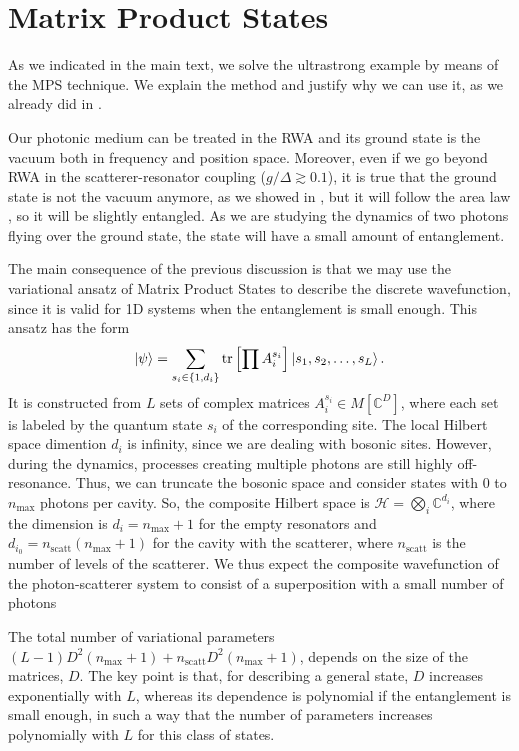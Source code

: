 \documentclass[aps,pra,reprint,amsmath,amssymb]{revtex4-1}
\begin{document}
\section{Matrix Product States}

As we indicated in the main text, we solve the ultrastrong example by means of the MPS technique. We explain the method and justify why we can use it, as we already did in \cite{Sanchez-Burillo2014,Sanchez-Burillo2015,Sanchez-Burillo2016a}.

Our photonic medium can be treated in the RWA and its ground state is the vacuum both in frequency and position space. Moreover, even if we go beyond RWA in the scatterer-resonator coupling ($g/\Delta\gtrsim 0.1$), it is true that the ground state is not the vacuum anymore, as we showed in \cite{Sanchez-Burillo2014}, but it will follow the area law \cite{Eisert2010}, so it will be slightly entangled. As we are studying the dynamics of two photons flying over the ground state, the state will have a small amount of entanglement.

The main consequence of the previous discussion is that we may use the variational ansatz of Matrix Product States \cite{Ripoll2006,Verstraete2008} to describe the discrete wavefunction, since it is valid for 1D systems when the entanglement is small enough. This ansatz has the form
\begin{equation}
\ket{\psi} = \sum_{s_i \in \{1,d_i\}} \mathrm{tr}\left[
\prod A_i^{s_i}\right] \ket{s_1,s_2,\ldots,s_L}.
\label{eq:mps}
\end{equation}
It is constructed from $L$ sets of complex matrices $A_i^{s_i} \in M[\mathbb{C}^{D}]$, where each set is labeled by the quantum state $s_i$ of the corresponding site. The local Hilbert space dimention $d_i$ is infinity, since we are dealing with bosonic sites. However, during the dynamics, processes creating multiple photons are still highly off-resonance. Thus, we can truncate the bosonic space and consider states with $0$ to
$n_\text{max}$ photons per cavity. So, the composite Hilbert space is $\mathcal{H}=\bigotimes_i \mathbb{C}^{d_i}$, where the dimension is $d_i=n_\text{max}+1$ for the empty resonators and $d_{i_0}=n_\text{scatt}(n_\text{max}+1)$ for the cavity with the scatterer, where $n_\text{scatt}$ is the number of levels of the scatterer. We thus expect the composite wavefunction of the photon-scatterer system to consist of a superposition with a small number of photons

The total number of variational parameters $(L-1)D^2(n_\text{max}+1) + n_\text{scatt}D^2(n_\text{max}+1)$, depends on the size of the matrices, $D$. The key point is that, for describing a general state, $D$ increases exponentially with $L$, whereas its dependence is polynomial if the entanglement is small enough, in such a way that the number of parameters increases polynomially with $L$ for this class of states.
\end{document}
